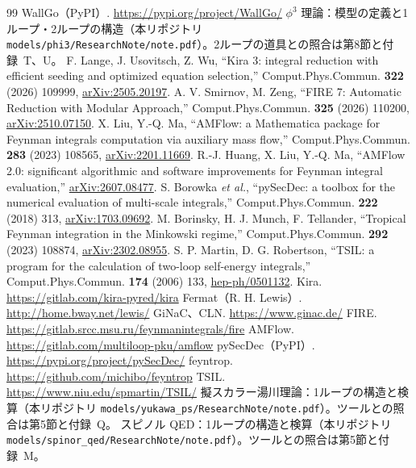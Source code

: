 \documentclass[a4paper,10pt]{ltjsarticle}
\begin{document}
\begin{thebibliography}{99}
 WallGo（PyPI）. \url{https://pypi.org/project/WallGo/}
 $\phi^3$ 理論：模型の定義と1ループ・2ループの構造（本リポジトリ \nolinkurl{models/phi3/ResearchNote/note.pdf}）。2ループの道具との照合は第8節と付録~T、U。
 F. Lange, J. Usovitsch, Z. Wu, ``Kira 3: integral reduction with efficient seeding and optimized equation selection,'' Comput.Phys.Commun. \textbf{322} (2026) 109999, \href{https://arxiv.org/abs/2505.20197}{arXiv:2505.20197}.
 A. V. Smirnov, M. Zeng, ``FIRE 7: Automatic Reduction with Modular Approach,'' Comput.Phys.Commun. \textbf{325} (2026) 110200, \href{https://arxiv.org/abs/2510.07150}{arXiv:2510.07150}.
 X. Liu, Y.-Q. Ma, ``AMFlow: a Mathematica package for Feynman integrals computation via auxiliary mass flow,'' Comput.Phys.Commun. \textbf{283} (2023) 108565, \href{https://arxiv.org/abs/2201.11669}{arXiv:2201.11669}.
 R.-J. Huang, X. Liu, Y.-Q. Ma, ``AMFlow 2.0: significant algorithmic and software improvements for Feynman integral evaluation,'' \href{https://arxiv.org/abs/2607.08477}{arXiv:2607.08477}.
 S. Borowka \textit{et al.}, ``pySecDec: a toolbox for the numerical evaluation of multi-scale integrals,'' Comput.Phys.Commun. \textbf{222} (2018) 313, \href{https://arxiv.org/abs/1703.09692}{arXiv:1703.09692}.
 M. Borinsky, H. J. Munch, F. Tellander, ``Tropical Feynman integration in the Minkowski regime,'' Comput.Phys.Commun. \textbf{292} (2023) 108874, \href{https://arxiv.org/abs/2302.08955}{arXiv:2302.08955}.
 S. P. Martin, D. G. Robertson, ``TSIL: a program for the calculation of two-loop self-energy integrals,'' Comput.Phys.Commun. \textbf{174} (2006) 133, \href{https://arxiv.org/abs/hep-ph/0501132}{hep-ph/0501132}.
 Kira. \url{https://gitlab.com/kira-pyred/kira}
 Fermat（R. H. Lewis）. \url{http://home.bway.net/lewis/}
 GiNaC、CLN. \url{https://www.ginac.de/}
 FIRE. \url{https://gitlab.srcc.msu.ru/feynmanintegrals/fire}
 AMFlow. \url{https://gitlab.com/multiloop-pku/amflow}
 pySecDec（PyPI）. \url{https://pypi.org/project/pySecDec/}
 feyntrop. \url{https://github.com/michibo/feyntrop}
 TSIL. \url{https://www.niu.edu/spmartin/TSIL/}
 擬スカラー湯川理論：1ループの構造と検算（本リポジトリ \nolinkurl{models/yukawa_ps/ResearchNote/note.pdf}）。ツールとの照合は第5節と付録~Q。
 スピノル QED：1ループの構造と検算（本リポジトリ \nolinkurl{models/spinor_qed/ResearchNote/note.pdf}）。ツールとの照合は第5節と付録~M。

\end{thebibliography}
\end{document}
